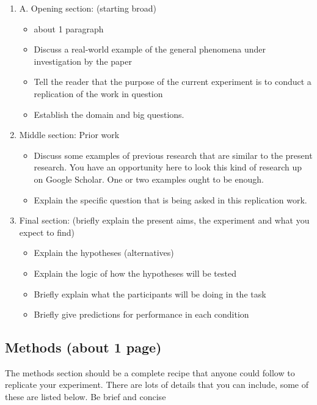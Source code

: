 \begin{enumerate}
\item A. Opening section: (starting broad)

\begin{itemize}
\item about 1 paragraph
\item Discuss a real-world example of the general phenomena under investigation by the paper
\item Tell the reader that the purpose of the current experiment is to conduct a replication of the work in question
\item  Establish the domain and big questions.
\end{itemize}

\item Middle section: Prior work

\begin{itemize}
\item Discuss some examples of previous research that are similar to the present research. You have an opportunity here to look this kind of research up on Google Scholar. One or two examples ought to be enough.
\item Explain the specific question that is being asked in this replication work.
\end{itemize}

\item Final section: (briefly explain the present aims, the experiment and what you expect to find)
\begin{itemize}
\item Explain the hypotheses (alternatives)
\item Explain the logic of how the hypotheses will be tested
\item Briefly explain what the participants will be doing in the task
\item Briefly give predictions for performance in each condition
\end{itemize}

\end{enumerate}


\subsection{Methods (about 1 page)}

The methods section should be a complete recipe that anyone could follow to replicate your experiment. There are lots of details that you can include, some of these are listed below. Be brief and concise

